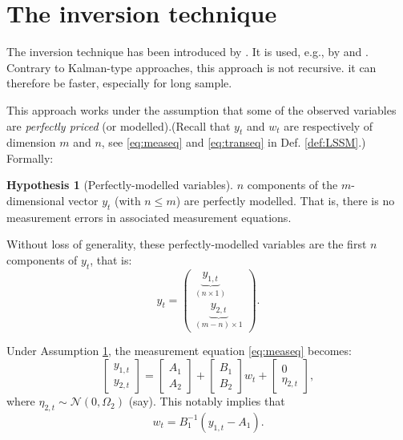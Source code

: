 \documentclass[
  12pt,
]{book}
\theoremstyle{definition}
\theoremstyle{definition}
\theoremstyle{definition}
\theoremstyle{definition}
\newtheorem{hypothesis}{Hypothesis}[chapter]
\theoremstyle{remark}
\begin{document}
\hypertarget{EstimationInversion}{%
\section{The inversion technique}\label{EstimationInversion}}

The inversion technique has been introduced by \citet{Chen_Scott_1993}. It is used, e.g., by \citet{Ang_Piazzesi_2003} and \citet{Liu_longstaff_Mandell_2006}. Contrary to Kalman-type approaches, this approach is not recursive. it can therefore be faster, especially for long sample.

This approach works under the assumption that some of the observed variables are \emph{perfectly priced} (or modelled).(Recall that \(y_t\) and \(w_t\) are respectively of dimension \(m\) and \(n\), see \eqref{eq:measeq} and \eqref{eq:transeq} in Def. \ref{def:LSSM}.) Formally:

\begin{hypothesis}[Perfectly-modelled variables]
\protect\hypertarget{hyp:perfectlymodelled}{}\label{hyp:perfectlymodelled}\(n\) components of the \(m\)-dimensional vector \(y_t\) (with \(n \le m\)) are perfectly modelled. That is, there is no measurement errors in associated measurement equations.

Without loss of generality, these perfectly-modelled variables are the first \(n\) components of \(y_t\), that is:
\[
y_t =
\left(\begin{array}{c}
\underbrace{y_{1,t}}_{(n \times 1)} \\
\underbrace{y_{2,t}}_{(m-n)\times1}
\end{array}\right).
\]
\end{hypothesis}

Under Assumption \ref{hyp:perfectlymodelled}, the measurement equation \eqref{eq:measeq} becomes:
\[
\left[
\begin{array}{c}
y_{1,t}\\
y_{2,t}
\end{array}
\right]
=
\left[
\begin{array}{c}
A_{1}\\
A_{2}
\end{array}
\right]+
\left[
\begin{array}{c}
B_{1}\\
B_{2}
\end{array}
\right]w_t +
\left[
\begin{array}{c}
0\\
\eta_{2,t}
\end{array}
\right],
\]
where \(\eta_{2,t} \sim \mathcal{N}(0,\Omega_2)\) (say). This notably implies that
\begin{equation}
w_t = B_{1}^{-1}(y_{1,t} - A_1).\label{eq:wY1}
\end{equation}
\end{document}
